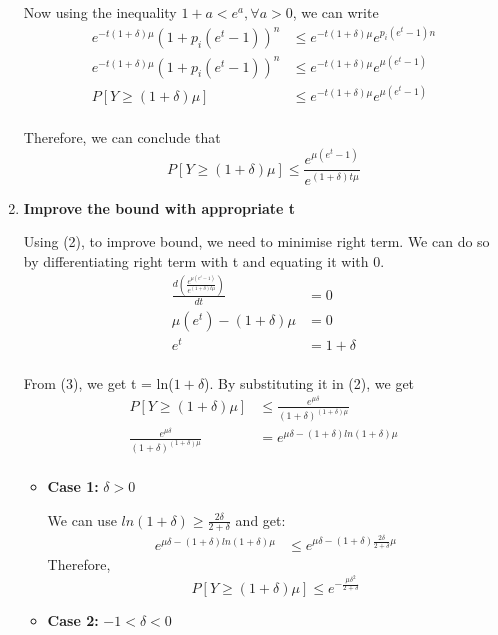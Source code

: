 \documentclass[12pt]{article}
\begin{document}
\begin{enumerate}
Now using the inequality $1+a < e^a, \forall a>0$, we can write
\begin{equation}
\begin{split}
    e^{-t(1+\delta)\mu}(1+p_i(e^t-1))^n& \leq e^{-t(1+\delta)\mu}e^{p_i(e^t-1)n} \\
    e^{-t(1+\delta)\mu}(1+p_i(e^t-1))^n& \leq e^{-t(1+\delta)\mu}e^{\mu(e^t-1)} \\
    P[Y \geq (1+\delta)\mu]& \leq e^{-t(1+\delta)\mu}e^{\mu(e^t-1)} \\
\end{split}
\end{equation}

Therefore, we can conclude that
\begin{equation}
    P[Y \geq (1+\delta)\mu] \leq \frac{e^{\mu(e^t-1)}}{e^{(1+\delta)t\mu}}
\end{equation}

    \item \textbf{Improve the bound with appropriate t}

Using (2), to improve bound, we need to minimise right term. We can do so by differentiating right term with t and equating it with 0.
\begin{equation}
\begin{split}
    \frac{d(\frac{e^{\mu(e^t-1)}}{e^{(1+\delta)t\mu}})}{dt}& = 0 \\
    \mu(e^t) - (1+\delta)\mu& = 0 \\
    e^t& = 1 + \delta \\
\end{split}
\end{equation}

From (3), we get t = ln($1+\delta$). By substituting it in (2), we get
\begin{equation}
\begin{split}
    P[Y \geq (1+\delta)\mu]& \leq \frac{e^{\mu\delta}}{(1+\delta)^{(1+\delta)\mu}} \\
    \frac{e^{\mu\delta}}{(1+\delta)^{(1+\delta)\mu}}& = e^{\mu\delta-(1+\delta)ln(1+\delta)\mu} \\
\end{split}
\end{equation}
\begin{itemize}
    \item \textbf{Case 1:}  $\delta > 0$

We can use $ln(1+\delta) \geq \frac{2\delta}{2+\delta}$ and get:
\begin{equation}
\begin{split}
      e^{\mu\delta-(1+\delta)ln(1+\delta)\mu}& \leq e^{\mu\delta-(1+\delta)\frac{2\delta}{2+\delta}\mu}
\end{split}
\end{equation}
Therefore,
\begin{equation}
    P[Y \geq (1+\delta)\mu] \leq e^{-\frac{\mu\delta^2}{2+\delta}}
\end{equation}
    \item \textbf{Case 2:}  $-1 < \delta < 0 $


\end{itemize}
\end{enumerate}
\end{document}
